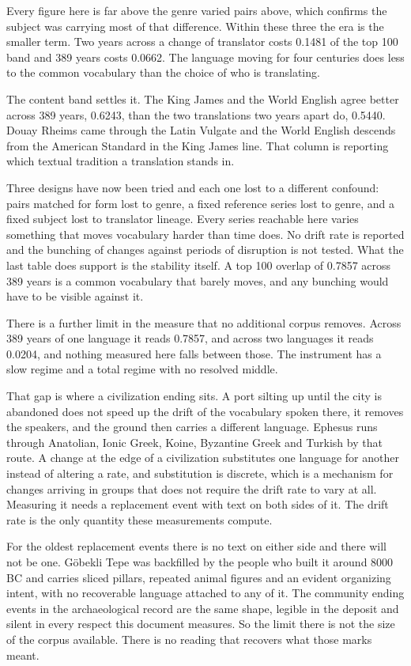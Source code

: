 Every figure here is far above the genre varied pairs above, which confirms the subject was carrying most of that difference. Within these three the era is the smaller term. Two years across a change of translator costs 0.1481 of the top 100 band and 389 years costs 0.0662. The language moving for four centuries does less to the common vocabulary than the choice of who is translating.

The content band settles it. The King James and the World English agree better across 389 years, 0.6243, than the two translations two years apart do, 0.5440. Douay Rheims came through the Latin Vulgate and the World English descends from the American Standard in the King James line. That column is reporting which textual tradition a translation stands in.

Three designs have now been tried and each one lost to a different confound: pairs matched for form lost to genre, a fixed reference series lost to genre, and a fixed subject lost to translator lineage. Every series reachable here varies something that moves vocabulary harder than time does. No drift rate is reported and the bunching of changes against periods of disruption is not tested. What the last table does support is the stability itself. A top 100 overlap of 0.7857 across 389 years is a common vocabulary that barely moves, and any bunching would have to be visible against it.

There is a further limit in the measure that no additional corpus removes. Across 389 years of one language it reads 0.7857, and across two languages it reads 0.0204, and nothing measured here falls between those. The instrument has a slow regime and a total regime with no resolved middle.

That gap is where a civilization ending sits. A port silting up until the city is abandoned does not speed up the drift of the vocabulary spoken there, it removes the speakers, and the ground then carries a different language. Ephesus runs through Anatolian, Ionic Greek, Koine, Byzantine Greek and Turkish by that route. A change at the edge of a civilization substitutes one language for another instead of altering a rate, and substitution is discrete, which is a mechanism for changes arriving in groups that does not require the drift rate to vary at all. Measuring it needs a replacement event with text on both sides of it. The drift rate is the only quantity these measurements compute.

For the oldest replacement events there is no text on either side and there will not be one. Göbekli Tepe was backfilled by the people who built it around 8000 BC and carries sliced pillars, repeated animal figures and an evident organizing intent, with no recoverable language attached to any of it. The community ending events in the archaeological record are the same shape, legible in the deposit and silent in every respect this document measures. So the limit there is not the size of the corpus available. There is no reading that recovers what those marks meant.

